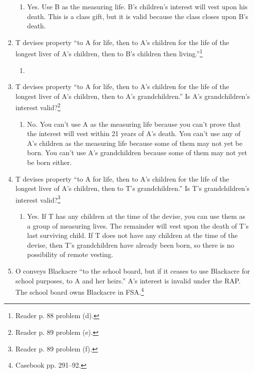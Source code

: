 \begin{enumerate}
    \begin{enumerate}
        \item Yes. Use B as the measuring life. B's children's interest will 
        vest upon his death. This is a class gift, but it is valid because the 
        class closes upon B's death.
    \end{enumerate}
    \item T devises property ``to A for life, then to A's children for the 
    life of the longest liver of A's children, then to B's children then 
    living.''\footnote{Reader p. 88 problem (d).}
    \begin{enumerate}
        \item %
    \end{enumerate}
    \item T devises property ``to A for life, then to A's children for the 
    life of the longest liver of A's children, then to A's grandchildren.'' Is 
    A's grandchildren's interest valid?\footnote{Reader p. 89 problem (e).}
    \begin{enumerate}
        \item No. You can't use A as the measuring life because you can't 
        prove that the interest will vest within 21 years of A's death. You 
        can't use any of A's children as the measuring life because some of 
        them may not yet be born. You can't use A's grandchildren because 
        some of them may not yet be born either.
    \end{enumerate}
    \item T devises property ``to A for life, then to A's children for the 
    life of the longest liver of A's children, then to T's grandchildren.'' Is 
    T's grandchildren's interest valid?\footnote{Reader p. 89 problem (f).}
    \begin{enumerate}
        \item Yes. If T has any children at the time of the devise, you can 
        use them as a group of measuring lives. The remainder will vest upon 
        the death of T's last surviving child. If T does not have any children 
        at the time of the devise, then T's grandchildren have already been 
        born, so there is no possibility of remote vesting.
    \end{enumerate}
    \item O conveys Blackacre ``to the school board, but if it ceases to use 
    Blackacre for school purposes, to A and her heirs.'' A's interest is 
    invalid under the RAP. The school board owns Blackacre in 
    FSA.\footnote{Casebook pp. 291--92.}
\end{enumerate}

